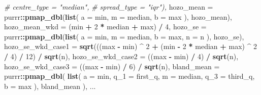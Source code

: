 \documentclass[
]{article}
\newenvironment{Shaded}{\begin{snugshade}}{\end{snugshade}}
\newcommand{\CommentTok}[1]{\textcolor[rgb]{0.56,0.35,0.01}{\textit{#1}}}
\newcommand{\DataTypeTok}[1]{\textcolor[rgb]{0.13,0.29,0.53}{#1}}
\newcommand{\DecValTok}[1]{\textcolor[rgb]{0.00,0.00,0.81}{#1}}
\newcommand{\KeywordTok}[1]{\textcolor[rgb]{0.13,0.29,0.53}{\textbf{#1}}}
\newcommand{\NormalTok}[1]{#1}
\newcommand{\OperatorTok}[1]{\textcolor[rgb]{0.81,0.36,0.00}{\textbf{#1}}}
\newcommand{\StringTok}[1]{\textcolor[rgb]{0.31,0.60,0.02}{#1}}
\begin{document}
\begin{Shaded}
\begin{Highlighting}[]
    \CommentTok{\#                          centre\_type = "median",}
    \CommentTok{\#                          spread\_type = "iqr"),}
    \DataTypeTok{hozo\_mean =}\NormalTok{ purrr}\OperatorTok{::}\KeywordTok{pmap\_dbl}\NormalTok{(}\KeywordTok{list}\NormalTok{(}
      \DataTypeTok{a =}\NormalTok{ min,}
      \DataTypeTok{m =}\NormalTok{ median,}
      \DataTypeTok{b =}\NormalTok{ max}
\NormalTok{    ), hozo\_mean),}
    \DataTypeTok{hozo\_mean\_wkd =}\NormalTok{ (min }\OperatorTok{+}\StringTok{ }\DecValTok{2} \OperatorTok{*}\StringTok{ }\NormalTok{median }\OperatorTok{+}\StringTok{ }\NormalTok{max) }\OperatorTok{/}\StringTok{ }\DecValTok{4}\NormalTok{,}
    \DataTypeTok{hozo\_se =}\NormalTok{ purrr}\OperatorTok{::}\KeywordTok{pmap\_dbl}\NormalTok{(}\KeywordTok{list}\NormalTok{(}
      \DataTypeTok{a =}\NormalTok{ min,}
      \DataTypeTok{m =}\NormalTok{ median,}
      \DataTypeTok{b =}\NormalTok{ max,}
      \DataTypeTok{n =}\NormalTok{ n}
\NormalTok{    ), hozo\_se), }
    \DataTypeTok{hozo\_se\_wkd\_case1 =} \KeywordTok{sqrt}\NormalTok{(((max }\OperatorTok{{-}}\StringTok{ }\NormalTok{min) }\OperatorTok{\^{}}\StringTok{ }\DecValTok{2} \OperatorTok{+}
\StringTok{                                }\NormalTok{(min }\OperatorTok{{-}}\StringTok{ }\DecValTok{2} \OperatorTok{*}\StringTok{ }\NormalTok{median }\OperatorTok{+}\StringTok{ }\NormalTok{max) }\OperatorTok{\^{}}\StringTok{ }\DecValTok{2} \OperatorTok{/}\StringTok{ }\DecValTok{4}\NormalTok{) }\OperatorTok{/}\StringTok{ }\DecValTok{12}\NormalTok{) }\OperatorTok{/}
\StringTok{      }\KeywordTok{sqrt}\NormalTok{(n),}
    \DataTypeTok{hozo\_se\_wkd\_case2 =}\NormalTok{ ((max }\OperatorTok{{-}}\StringTok{ }\NormalTok{min) }\OperatorTok{/}\StringTok{ }\DecValTok{4}\NormalTok{) }\OperatorTok{/}\StringTok{ }\KeywordTok{sqrt}\NormalTok{(n),}
    \DataTypeTok{hozo\_se\_wkd\_case3 =}\NormalTok{ ((max }\OperatorTok{{-}}\StringTok{ }\NormalTok{min) }\OperatorTok{/}\StringTok{ }\DecValTok{6}\NormalTok{) }\OperatorTok{/}\StringTok{ }\KeywordTok{sqrt}\NormalTok{(n),}
    \DataTypeTok{bland\_mean =}\NormalTok{ purrr}\OperatorTok{::}\KeywordTok{pmap\_dbl}\NormalTok{(}
      \KeywordTok{list}\NormalTok{(}
        \DataTypeTok{a =}\NormalTok{  min,}
        \DataTypeTok{q\_1 =}\NormalTok{ first\_q,}
        \DataTypeTok{m =}\NormalTok{ median,}
        \DataTypeTok{q\_3 =}\NormalTok{ third\_q,}
        \DataTypeTok{b =}\NormalTok{ max}
\NormalTok{      ),}
\NormalTok{      bland\_mean}
\NormalTok{    ),    }
\NormalTok{    ...}
\end{Highlighting}
\end{Shaded}
\end{document}
